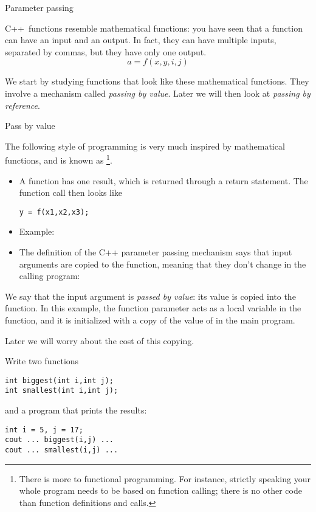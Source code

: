  {Parameter passing}
\label{sec:passing}
%

C++~functions resemble mathematical functions: you have seen that a
function can have an input and an output. In fact, they can have
multiple inputs, separated by commas, but they have only one
output.
\[ a = f(x,y,i,j) \]

We start by studying functions that look like these mathematical
functions. They involve a  mechanism
called
\emph{passing by value}.
%
Later we will then look at
\emph{passing by reference}.

 {Pass by value}
\label{sec:pass-value}

The following style of programming is very much inspired by
mathematical functions, and is known as \footnote {There is more to functional programming. For
  instance, strictly speaking your whole program needs to be based on
  function calling; there is no other code than function definitions
  and calls.}.
\begin{itemize}
\item A function has one result, which is returned through a return
  statement. The function call then looks like
\begin{lstlisting}
y = f(x1,x2,x3);
\end{lstlisting}
\item Example:
\item The definition of the C++ parameter passing mechanism says that
  input arguments are copied to the function, meaning that they don't
  change in the calling program:

\end{itemize}

We say that the input argument is
\emph{passed by value}:
its value is copied into the
function.  In this example, the function parameter  acts as a
local variable in the function, and it is initialized with a copy of
the value of  in the main program.

Later we will worry about the cost of this copying.

\begin{exercise}
  \label{ex:swapbyvalue}
  Write two functions
\begin{lstlisting}
int biggest(int i,int j);
int smallest(int i,int j);
\end{lstlisting}
  and a program that prints the results:
\begin{lstlisting}
int i = 5, j = 17;
cout ... biggest(i,j) ...
cout ... smallest(i,j) ...
\end{lstlisting}
\end{exercise}

